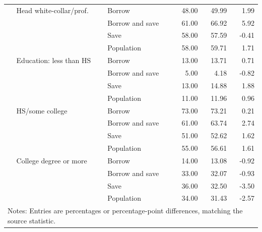 \begin{longtable}{lllrrr}
 & Head white-collar/prof. & Borrow & 48.00 & 49.99 & 1.99 \\
 &  & Borrow and save & 61.00 & 66.92 & 5.92 \\
 &  & Save & 58.00 & 57.59 & -0.41 \\
 &  & Population & 58.00 & 59.71 & 1.71 \\
 & Education: less than HS & Borrow & 13.00 & 13.71 & 0.71 \\
 &  & Borrow and save & 5.00 & 4.18 & -0.82 \\
 &  & Save & 13.00 & 14.88 & 1.88 \\
 &  & Population & 11.00 & 11.96 & 0.96 \\
 & HS/some college & Borrow & 73.00 & 73.21 & 0.21 \\
 &  & Borrow and save & 61.00 & 63.74 & 2.74 \\
 &  & Save & 51.00 & 52.62 & 1.62 \\
 &  & Population & 55.00 & 56.61 & 1.61 \\
 & College degree or more & Borrow & 14.00 & 13.08 & -0.92 \\
 &  & Borrow and save & 33.00 & 32.07 & -0.93 \\
 &  & Save & 36.00 & 32.50 & -3.50 \\
 &  & Population & 34.00 & 31.43 & -2.57 \\
\bottomrule
\multicolumn{6}{l}{\footnotesize Notes: Entries are percentages or percentage-point differences, matching the source statistic.}\\
\end{longtable}

